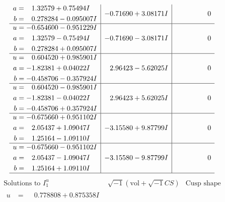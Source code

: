 \documentclass[1p]{elsarticle_modified}
\theoremstyle{definition}
\newcommand{\I}{\sqrt{-1}}
\begin{document}
$$\begin{array}{c|c|c}
\begin{aligned}
a &= \phantom{-}1.32579 + 0.75494 I \\
b &= \phantom{-}0.278284 - 0.095007 I\end{aligned}
 & -0.71690 + 3.08171 I & \phantom{-0.000000 } 0 \\ \hline\begin{aligned}
u &= -0.654600 - 0.951229 I \\
a &= \phantom{-}1.32579 - 0.75494 I \\
b &= \phantom{-}0.278284 + 0.095007 I\end{aligned}
 & -0.71690 - 3.08171 I & \phantom{-0.000000 } 0 \\ \hline\begin{aligned}
u &= \phantom{-}0.604520 + 0.985901 I \\
a &= -1.82381 + 0.04022 I \\
b &= -0.458706 - 0.357924 I\end{aligned}
 & \phantom{-}2.96423 - 5.62025 I & \phantom{-0.000000 } 0 \\ \hline\begin{aligned}
u &= \phantom{-}0.604520 - 0.985901 I \\
a &= -1.82381 - 0.04022 I \\
b &= -0.458706 + 0.357924 I\end{aligned}
 & \phantom{-}2.96423 + 5.62025 I & \phantom{-0.000000 } 0 \\ \hline\begin{aligned}
u &= -0.675660 + 0.951102 I \\
a &= \phantom{-}2.05437 + 1.09047 I \\
b &= \phantom{-}1.25164 - 1.09110 I\end{aligned}
 & -3.15580 + 9.87799 I & \phantom{-0.000000 } 0 \\ \hline\begin{aligned}
u &= -0.675660 - 0.951102 I \\
a &= \phantom{-}2.05437 - 1.09047 I \\
b &= \phantom{-}1.25164 + 1.09110 I\end{aligned}
 & -3.15580 - 9.87799 I & \phantom{-0.000000 } 0\\
 \hline 
 \end{array}$$\newpage$$\begin{array}{c|c|c}  
\text{Solutions to }I^u_{1}& \I (\text{vol} + \sqrt{-1}CS) & \text{Cusp shape}\\
 \hline 
\begin{aligned}
u &= \phantom{-}0.778808 + 0.875358 I \\

\end{aligned}
\end{array}$$
\end{document}
